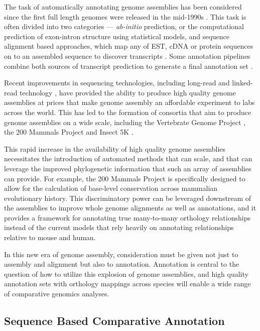 \documentclass[fleqn,10pt]{wlscirep}
\begin{document}
The task of automatically annotating genome assemblies has been considered since the first full length genomes were released in the mid-1990s \cite{letovsky1998gdb,lukashin1998genemark,haussler1996generalized}. This task is often divided into two categories --- \textit{ab-initio} prediction, or the computational prediction of exon-intron structure using statistical models, and sequence alignment based approaches, which map any of EST, cDNA or protein sequences on to an assembled sequence to discover transcripts \cite{Aken01012016}. Some annotation pipelines combine both sources of transcript prediction to generate a final annotation set \cite{pruitt2006ncbi,cantarel2008maker}.

Recent improvements in sequencing technologies, including long-read \cite{gordon2016long} and linked-read technology \cite{10xassembly}, have provided the ability to produce high quality genome assemblies at prices that make genome assembly an affordable experiment to labs across the world. This has led to the formation of consortia that aim to produce genome assemblies on a wide scale, including the Vertebrate Genome Project \cite{haussler2009genome},
the 200 Mammals Project and Insect 5K \cite{robinson2011creating}.

This rapid increase in the availability of high quality genome assemblies necessitates the introduction of automated methods that can scale, and that can leverage the improved phylogenetic information that such an array of assemblies can provide. For example, the 200 Mammals Project is specifically designed to allow for the calculation of base-level conservation across mammalian evolutionary history. This discriminatory power can be leveraged downstream of the assemblies to improve whole genome alignments as well as annotations, and it provides a framework for annotating true many-to-many orthology relationships instead of the current models that rely heavily on annotating relationships relative to mouse and human.

In this new era of genome assembly, consideration must be given not just to assembly and alignment but also to annotation. Annotation is central to the question of how to utilize this explosion of genome assemblies, and high quality annotation sets with orthology mappings across species will enable a wide range of comparative genomics analyses.

\subsection{Sequence Based Comparative Annotation}
\end{document}
